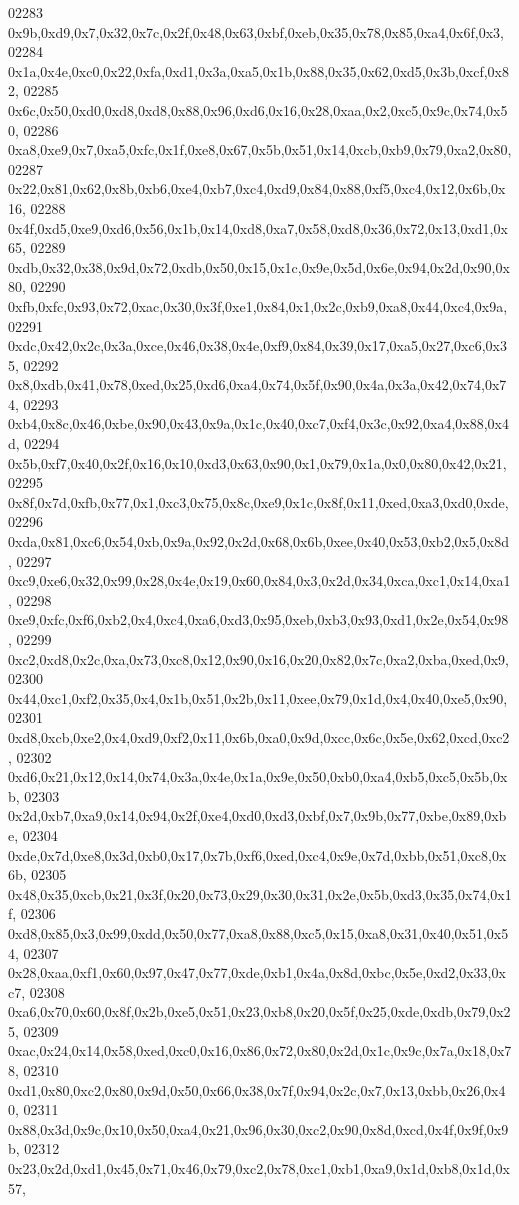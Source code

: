 \begin{DoxyCode}
02283   0x9b,0xd9,0x7,0x32,0x7c,0x2f,0x48,0x63,0xbf,0xeb,0x35,0x78,0x85,0xa4,0x6f,0x3,
02284   0x1a,0x4e,0xc0,0x22,0xfa,0xd1,0x3a,0xa5,0x1b,0x88,0x35,0x62,0xd5,0x3b,0xcf,0x82,
02285   0x6c,0x50,0xd0,0xd8,0xd8,0x88,0x96,0xd6,0x16,0x28,0xaa,0x2,0xc5,0x9c,0x74,0x50,
02286   0xa8,0xe9,0x7,0xa5,0xfc,0x1f,0xe8,0x67,0x5b,0x51,0x14,0xcb,0xb9,0x79,0xa2,0x80,
02287   0x22,0x81,0x62,0x8b,0xb6,0xe4,0xb7,0xc4,0xd9,0x84,0x88,0xf5,0xc4,0x12,0x6b,0x16,
02288   0x4f,0xd5,0xe9,0xd6,0x56,0x1b,0x14,0xd8,0xa7,0x58,0xd8,0x36,0x72,0x13,0xd1,0x65,
02289   0xdb,0x32,0x38,0x9d,0x72,0xdb,0x50,0x15,0x1c,0x9e,0x5d,0x6e,0x94,0x2d,0x90,0x80,
02290   0xfb,0xfc,0x93,0x72,0xac,0x30,0x3f,0xe1,0x84,0x1,0x2c,0xb9,0xa8,0x44,0xc4,0x9a,
02291   0xdc,0x42,0x2c,0x3a,0xce,0x46,0x38,0x4e,0xf9,0x84,0x39,0x17,0xa5,0x27,0xc6,0x35,
02292   0x8,0xdb,0x41,0x78,0xed,0x25,0xd6,0xa4,0x74,0x5f,0x90,0x4a,0x3a,0x42,0x74,0x74,
02293   0xb4,0x8c,0x46,0xbe,0x90,0x43,0x9a,0x1c,0x40,0xc7,0xf4,0x3c,0x92,0xa4,0x88,0x4d,
02294   0x5b,0xf7,0x40,0x2f,0x16,0x10,0xd3,0x63,0x90,0x1,0x79,0x1a,0x0,0x80,0x42,0x21,
02295   0x8f,0x7d,0xfb,0x77,0x1,0xc3,0x75,0x8c,0xe9,0x1c,0x8f,0x11,0xed,0xa3,0xd0,0xde,
02296   0xda,0x81,0xc6,0x54,0xb,0x9a,0x92,0x2d,0x68,0x6b,0xee,0x40,0x53,0xb2,0x5,0x8d,
02297   0xc9,0xe6,0x32,0x99,0x28,0x4e,0x19,0x60,0x84,0x3,0x2d,0x34,0xca,0xc1,0x14,0xa1,
02298   0xe9,0xfc,0xf6,0xb2,0x4,0xc4,0xa6,0xd3,0x95,0xeb,0xb3,0x93,0xd1,0x2e,0x54,0x98,
02299   0xc2,0xd8,0x2c,0xa,0x73,0xc8,0x12,0x90,0x16,0x20,0x82,0x7c,0xa2,0xba,0xed,0x9,
02300   0x44,0xc1,0xf2,0x35,0x4,0x1b,0x51,0x2b,0x11,0xee,0x79,0x1d,0x4,0x40,0xe5,0x90,
02301   0xd8,0xcb,0xe2,0x4,0xd9,0xf2,0x11,0x6b,0xa0,0x9d,0xcc,0x6c,0x5e,0x62,0xcd,0xc2,
02302   0xd6,0x21,0x12,0x14,0x74,0x3a,0x4e,0x1a,0x9e,0x50,0xb0,0xa4,0xb5,0xc5,0x5b,0xb,
02303   0x2d,0xb7,0xa9,0x14,0x94,0x2f,0xe4,0xd0,0xd3,0xbf,0x7,0x9b,0x77,0xbe,0x89,0xbe,
02304   0xde,0x7d,0xe8,0x3d,0xb0,0x17,0x7b,0xf6,0xed,0xc4,0x9e,0x7d,0xbb,0x51,0xc8,0x6b,
02305   0x48,0x35,0xcb,0x21,0x3f,0x20,0x73,0x29,0x30,0x31,0x2e,0x5b,0xd3,0x35,0x74,0x1f,
02306   0xd8,0x85,0x3,0x99,0xdd,0x50,0x77,0xa8,0x88,0xc5,0x15,0xa8,0x31,0x40,0x51,0x54,
02307   0x28,0xaa,0xf1,0x60,0x97,0x47,0x77,0xde,0xb1,0x4a,0x8d,0xbc,0x5e,0xd2,0x33,0xc7,
02308   0xa6,0x70,0x60,0x8f,0x2b,0xe5,0x51,0x23,0xb8,0x20,0x5f,0x25,0xde,0xdb,0x79,0x25,
02309   0xac,0x24,0x14,0x58,0xed,0xc0,0x16,0x86,0x72,0x80,0x2d,0x1c,0x9c,0x7a,0x18,0x78,
02310   0xd1,0x80,0xc2,0x80,0x9d,0x50,0x66,0x38,0x7f,0x94,0x2c,0x7,0x13,0xbb,0x26,0x40,
02311   0x88,0x3d,0x9c,0x10,0x50,0xa4,0x21,0x96,0x30,0xc2,0x90,0x8d,0xcd,0x4f,0x9f,0x9b,
02312   0x23,0x2d,0xd1,0x45,0x71,0x46,0x79,0xc2,0x78,0xc1,0xb1,0xa9,0x1d,0xb8,0x1d,0x57,

\end{DoxyCode}
